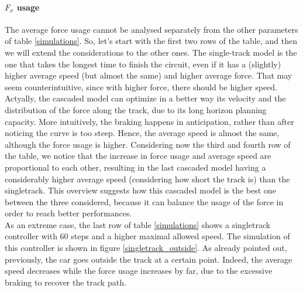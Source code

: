 \documentclass[a4paper, onecolumn, 12pt]{article}
\begin{document}
\paragraph{$F_x$ usage}
The average force usage cannot be analysed separately from the other parameters
of table \ref{simulations}. So, let's start with the first two rows of the
table, and then we will extend the considerations to the other ones. The
single-track model is the one that takes the longest time to finish the circuit,
even if it has a (slightly) higher average speed (but almost the same) and
higher average force. That may seem counterintuitive, since with higher force,
there should be higher speed. Actyally, the cascaded model can optimize in a
better way its velocity and the distribution of the force along the track, due
to its long horizon planning capacity. More intuitively, the braking happens in
anticipation, rather than after noticing the curve is too steep. Hence, the
average speed is almost the same, although the force usage is higher.
Considering now the third and fourth row of the table, we notice that the
increase in force usage and average speed are proportional to each other,
resulting in the last cascaded model having a considerably higher average speed
(considering how short the track is) than the singletrack. This overview
suggests how this cascaded model is the best one between the three considered,
because it can balance the usage of the force in order to reach better
performances.\\
As an extreme case, the last row of table \ref{simulations} shows a singletrack
controller with 60 steps and a higher maximal allowed speed. The simulation of
this controller is shown in figure \ref{singletrack_outside}. As already pointed
out, previously, the car goes outside the track at a certain point. Indeed, the
average speed decreases while the force usage increases by far, due to the
excessive braking to recover the track path.
\end{document}
